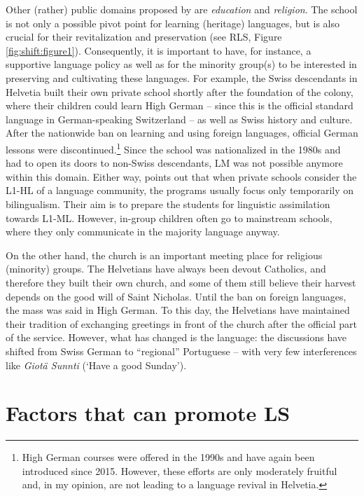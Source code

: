 \documentclass[output=paper]{langscibook}
\begin{document}
Other (rather) public domains proposed by \textcite{Fishman1972} are \emph{education} and \emph{religion}. The school is not only a possible pivot point for learning (heritage) languages, but is also crucial for their revitalization and preservation (see RLS, Figure \ref{fig:shift:figure1}). Consequently, it is important to have, for instance, a supportive language policy as well as for the minority group(s) to be interested in preserving and cultivating these languages. For example, the Swiss descendants in Helvetia \parencite{Karnopp} built their own private school shortly after the foundation of the colony, where their children could learn High German -- since this is the official standard language in German-speaking Switzerland -- as well as Swiss history and culture. After the nationwide ban on learning and using foreign languages, official German lessons were discontinued.\footnote{High German courses were offered in the 1990s and have again been introduced since 2015. However, these efforts are only moderately fruitful and, in my opinion, are not leading to a language revival in Helvetia.} Since the school was nationalized in the 1980s and had to open its doors to non-Swiss descendants, LM  was not possible anymore within this domain. Either way, \textcite[95--96]{Pauwels2016} points out that when private schools consider the L1-HL of a language community, the programs usually focus only temporarily on bilingualism. Their aim is to prepare the students for linguistic assimilation towards L1-ML. However, in-group children often go to mainstream schools, where they only communicate in the majority language anyway.

On the other hand, the church is an important meeting place for religious (minority) groups. The Helvetians have always been devout Catholics, and therefore they built their own church, and some of them still believe their harvest depends on the good will of Saint Nicholas. Until the ban on foreign languages, the mass was said in High German. To this day, the Helvetians have maintained their tradition of exchanging greetings in front of the church after the official part of the service. However, what has changed is the language: the discussions have shifted from Swiss German to ``regional'' Portuguese -- with very few interferences like \emph{Giotä Sunnti} (`Have a good Sunday').

\section{Factors that can promote LS}
\label{sec:shift:factors}
\end{document}
